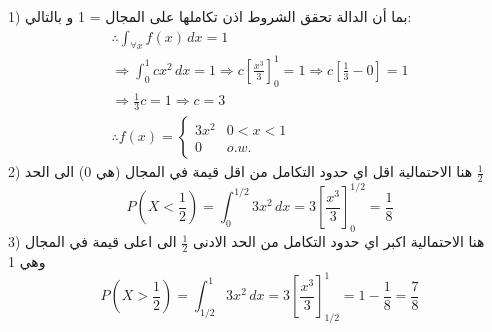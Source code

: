 \begin{solution}
	1) بما أن الدالة تحقق الشروط اذن تكاملها على المجال = 1 و بالتالي:
\begin{gather*}
	\therefore\int_{\forall x} f(x) \, dx = 1\\
	\Rightarrow \int_0^1 cx^2 \, dx = 1\Rightarrow c\left[\frac{x^3}{3}\right]^1_0 =1 \Rightarrow c\left[\frac{1}{3} -0 \right]=1\\
	\Rightarrow \frac{1}{3}c=1\Rightarrow \boxed{c=3}\\
	\therefore f(x) = \begin{cases}
		3x^2 & 0<x<1 \\
		0 & o.w.
	\end{cases}
\end{gather*}
2) هنا الاحتمالية اقل اي حدود التكامل من اقل قيمة في المجال (هي 0) الى الحد $\frac{1}{2}$
\[
P\left(X<\frac{1}{2}\right) = \int_0^{1/2} 3x^2 \, dx = 3 \left[\frac{x^3}{3}\right]^{1/2}_0 = \frac{1}{8}
 \]
 3) هنا الاحتمالية اكبر اي حدود التكامل من الحد الادنى $\frac{1}{2}$ الى اعلى قيمة في المجال وهي 1
 \[
P\left(X>\frac{1}{2}\right) = \int_{1/2}^1 3x^2 \, dx = 3 \left[\frac{x^3}{3}\right]^1_{1/2} = 1-\frac{1}{8} = \frac{7}{8}
 \]
\end{solution}



